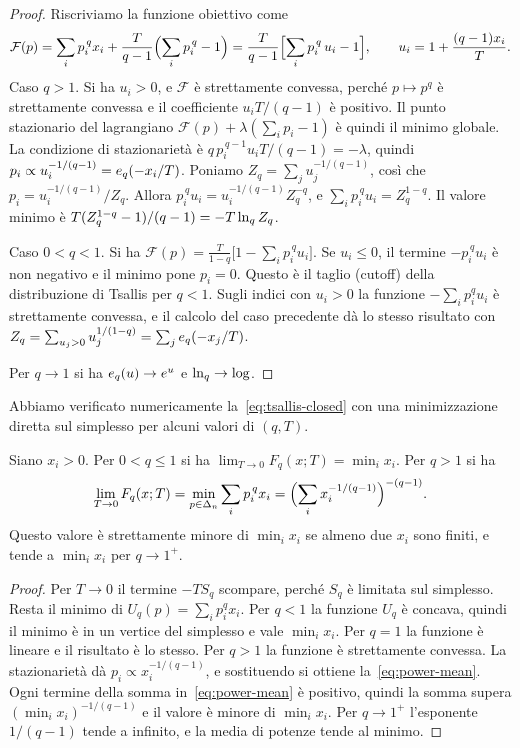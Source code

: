 \begin{proof}
Riscriviamo la funzione obiettivo come
\begin{equation*}
\mathcal F(p)=\sum_ip_i^{\,q}x_i+\frac{T}{q-1}\Bigl(\sum_ip_i^{\,q}-1\Bigr)=\frac{T}{q-1}\Bigl[\sum_ip_i^{\,q}\,u_i-1\Bigr],\qquad u_i=1+\frac{(q-1)x_i}{T}.
\end{equation*}
Caso $q>1$.
Si ha $u_i>0$, e $\mathcal F$ è strettamente convessa, perché $p\mapsto p^q$ è strettamente convessa e il coefficiente $u_iT/(q-1)$ è positivo.
Il punto stazionario del lagrangiano $\mathcal F(p)+\lambda(\sum_ip_i-1)$ è quindi il minimo globale.
La condizione di stazionarietà è $q\,p_i^{\,q-1}u_iT/(q-1)=-\lambda$, quindi $p_i\propto u_i^{-1/(q-1)}=e_q(-x_i/T)$.
Poniamo $Z_q=\sum_ju_j^{-1/(q-1)}$, così che $p_i=u_i^{-1/(q-1)}/Z_q$.
Allora $p_i^{\,q}u_i=u_i^{-1/(q-1)}Z_q^{-q}$, e $\sum_ip_i^{\,q}u_i=Z_q^{1-q}$.
Il valore minimo è $T(Z_q^{1-q}-1)/(q-1)=-T\ln_q Z_q$.

Caso $0<q<1$.
Si ha $\mathcal F(p)=\frac{T}{1-q}\bigl[1-\sum_ip_i^{\,q}u_i\bigr]$.
Se $u_i\le0$, il termine $-p_i^{\,q}u_i$ è non negativo e il minimo pone $p_i=0$.
Questo è il taglio (cutoff) della distribuzione di Tsallis per $q<1$.
Sugli indici con $u_i>0$ la funzione $-\sum_ip_i^qu_i$ è strettamente convessa, e il calcolo del caso precedente dà lo stesso risultato con $Z_q=\sum_{u_j>0}u_j^{1/(1-q)}=\sum_je_q(-x_j/T)$.

Per $q\to1$ si ha $e_q(u)\to e^{u}$ e $\ln_q\to\log$.
\end{proof}

Abbiamo verificato numericamente la~\eqref{eq:tsallis-closed} con una minimizzazione diretta sul simplesso per alcuni valori di $(q,T)$.

\begin{corollario}
\label{cor:tsallis-T0}
Siano $x_i>0$.
Per $0<q\le1$ si ha $\lim_{T\to0}F_q(x;T)=\min_ix_i$.
Per $q>1$ si ha
\begin{equation}
\lim_{T\to0}F_q(x;T)=\min_{p\in\Delta_n}\sum_ip_i^{\,q}x_i=\Bigl(\sum_ix_i^{-1/(q-1)}\Bigr)^{-(q-1)}.
\label{eq:power-mean}
\end{equation}
Questo valore è strettamente minore di $\min_ix_i$ se almeno due $x_i$ sono finiti, e tende a $\min_ix_i$ per $q\to1^+$.
\end{corollario}

\begin{proof}
Per $T\to0$ il termine $-TS_q$ scompare, perché $S_q$ è limitata sul simplesso.
Resta il minimo di $U_q(p)=\sum_ip_i^qx_i$.
Per $q<1$ la funzione $U_q$ è concava, quindi il minimo è in un vertice del simplesso e vale $\min_ix_i$.
Per $q=1$ la funzione è lineare e il risultato è lo stesso.
Per $q>1$ la funzione è strettamente convessa.
La stazionarietà dà $p_i\propto x_i^{-1/(q-1)}$, e sostituendo si ottiene la~\eqref{eq:power-mean}.
Ogni termine della somma in~\eqref{eq:power-mean} è positivo, quindi la somma supera $(\min_ix_i)^{-1/(q-1)}$ e il valore è minore di $\min_ix_i$.
Per $q\to1^+$ l'esponente $1/(q-1)$ tende a infinito, e la media di potenze tende al minimo.
\end{proof}

